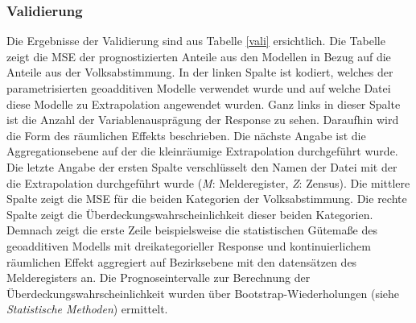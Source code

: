 \documentclass{Vorlage}
\begin{document}
\subsubsection{Validierung}
Die Ergebnisse der Validierung sind aus Tabelle \ref{vali} ersichtlich. Die Tabelle zeigt die MSE der prognostizierten Anteile aus den Modellen in Bezug auf die Anteile aus der Volksabstimmung. In der linken Spalte ist kodiert, welches der parametrisierten geoadditiven Modelle verwendet wurde und auf welche Datei diese Modelle zu Extrapolation angewendet wurden. Ganz links in dieser Spalte ist die Anzahl der Variablenausprägung der Response zu sehen. Daraufhin wird die Form des räumlichen Effekts beschrieben. Die nächste Angabe ist die Aggregationsebene auf der die kleinräumige Extrapolation durchgeführt wurde. Die letzte Angabe der ersten Spalte verschlüsselt den Namen der Datei mit der die Extrapolation durchgeführt wurde (\textit{M}: Melderegister, \textit{Z}: Zensus). Die mittlere Spalte zeigt die MSE für die beiden Kategorien der Volksabstimmung. Die rechte Spalte zeigt die Überdeckungswahrscheinlichkeit dieser beiden Kategorien. Demnach zeigt die erste Zeile beispielsweise die statistischen Gütemaße des geoadditiven Modells mit dreikategorieller Response und kontinuierlichem räumlichen Effekt aggregiert auf Bezirksebene mit den datensätzen des Melderegisters an. Die Prognoseintervalle zur Berechnung der Überdeckungswahrscheinlichkeit wurden über Bootstrap-Wiederholungen (siehe \textit{Statistische Methoden}) ermittelt.
\end{document}
